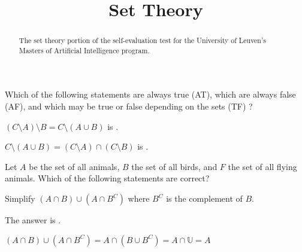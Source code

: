 \documentclass{ximera}
\title{Set Theory}
\begin{document}
\begin{abstract}
The set theory portion of the self-evaluation test for the
University of Leuven's Masters of Artificial Intelligence program.
\end{abstract}
\maketitle

\begin{question}
Which of the following statements are always true (AT), which are
always false (AF), and which may be true or false depending on the
sets (TF) ?
\begin{solution}
$(C \setminus A) \setminus B = C \setminus (A \cup B)$ is .
\end{solution}
\begin{solution}
$C \setminus (A \cup B) = (C \setminus A) \cap (C\setminus B)$ is .
\end{solution}
\end{question}

\begin{question}
Let $A$ be the set of all animals, $B$ the set of all birds, and $F$
the set of all flying animals. Which of the following statements are correct?
\begin{solution}
\begin{multiple-choice}
\end{multiple-choice}
\end{solution}
\end{question}

\begin{question}
Simplify $(A \cap B) \cup (A \cap B^C)$ where $B^C$ is the complement of $B$.
\begin{solution}
The answer is .
\end{solution}
$(A \cap B) \cup (A \cap B^C) = A \cap (B \cup B^C) = A \cap \mathbb{U} = A$
\end{question}
\end{document}
